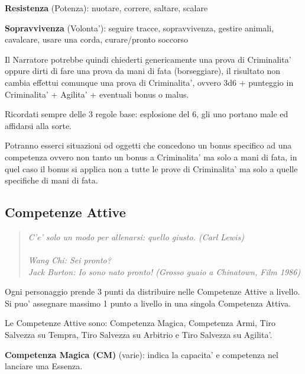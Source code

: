\documentclass[a4paper,11pt,twoside,openany]{book}
\begin{document}
\textbf{Resistenza} (Potenza): nuotare, correre, saltare, scalare

\textbf{Sopravvivenza} (Volonta'): seguire tracce, sopravvivenza, gestire animali, cavalcare, usare una corda, curare/pronto soccorso

\bigskip

Il Narratore potrebbe quindi chiederti genericamente una prova di
Criminalita' oppure dirti di fare una prova da mani di fata (borseggiare),
il risultato non cambia effettui comunque una prova di Criminalita',
ovvero 3d6 + punteggio in Criminalita' + Agilita' + eventuali bonus
o malus.

Ricordati sempre delle 3 regole base: esplosione del 6, gli uno portano
male ed affidarsi alla sorte.

\bigskip

Potranno esserci situazioni od oggetti che concedono un bonus specifico ad una competenza ovvero non tanto un bonus a Criminalita' ma solo a mani di fata, in quel caso il bonus si applica non a tutte le prove di Criminalita' ma solo a quelle specifiche di mani di fata.


\subsection{Competenze Attive}

\label{competenze-attive}
\begin{quote}\textit{C'e' solo un modo per allenarsi: quello giusto. (Carl Lewis)\\\\
Wang Chi: Sei pronto?\\
Jack Burton: Io sono nato pronto! (Grosso guaio a Chinatown, Film 1986)
}\end{quote}

Ogni personaggio prende 3 punti da distribuire nelle Competenze Attive a livello. Si puo' assegnare massimo 1 punto a livello in una singola Competenza Attiva.

Le Competenze Attive sono: Competenza Magica, Competenza Armi, Tiro Salvezza su Tempra, Tiro Salvezza su Arbitrio e Tiro Salvezza su Agilita'.

\textbf{Competenza Magica (CM)} (varie): indica la capacita' e competenza nel lanciare una Essenza.
\end{document}
